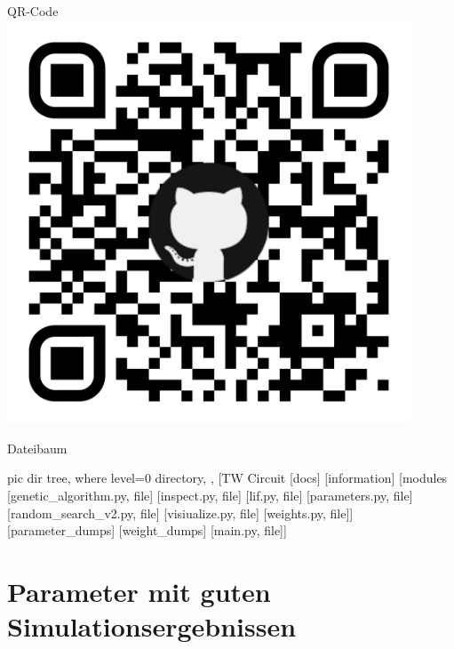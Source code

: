 \begin{minipage}[b]{0.38\textwidth}
	\begin{mybox}{QR-Code}
		\centering
		\includegraphics[width=0.9\textwidth]{figures/appendix/qr-code.pdf}
	\end{mybox}
	\begin{mybox}{Dateibaum}
		\vspace{0.1cm}
		\begin{forest}
			pic dir tree,
			where level=0{}{%
				directory,
			},
			[TW Circuit
			[docs]
			[information]
			[modules
			[genetic\_algorithm.py, file]
			[inspect.py, file]
			[lif.py, file]
			[parameters.py, file]
			[random\_search\_v2.py, file]
			[visiualize.py, file]
			[weights.py, file]]
			[parameter\_dumps]
			[weight\_dumps]
			[main.py, file]]
		\end{forest}
	\end{mybox}
\end{minipage}
%
\chapter{Parameter mit guten Simulationsergebnissen}
%
\label{app:parameter}

